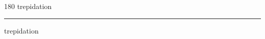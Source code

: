 
\begin{frame}
\begin{center}
\begin{turn}{180}
{\fontsize{2.5cm}{1em}\selectfont trepidation}
\end{turn}
\vspace{1em}\par  
\hrule
\vspace{1em}\par  
{\fontsize{2.5cm}{1em}\selectfont trepidation}
\end{center}
\end{frame}
